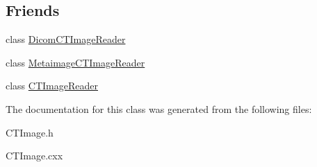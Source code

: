 \subsection*{Friends}
\begin{DoxyCompactItemize}
\item 
\hypertarget{class_c_t_image_a5cc1455156c67f189525c313a80fb9fc}{
class \hyperlink{class_c_t_image_a5cc1455156c67f189525c313a80fb9fc}{DicomCTImageReader}}
\label{class_c_t_image_a5cc1455156c67f189525c313a80fb9fc}

\item 
\hypertarget{class_c_t_image_a0966d000a96e20736d2debc5591acef1}{
class \hyperlink{class_c_t_image_a0966d000a96e20736d2debc5591acef1}{MetaimageCTImageReader}}
\label{class_c_t_image_a0966d000a96e20736d2debc5591acef1}

\item 
\hypertarget{class_c_t_image_ac136807d795545b8468400f61e1b95d2}{
class \hyperlink{class_c_t_image_ac136807d795545b8468400f61e1b95d2}{CTImageReader}}
\label{class_c_t_image_ac136807d795545b8468400f61e1b95d2}

\end{DoxyCompactItemize}


The documentation for this class was generated from the following files:\begin{DoxyCompactItemize}
\item 
CTImage.h\item 
CTImage.cxx\end{DoxyCompactItemize}
